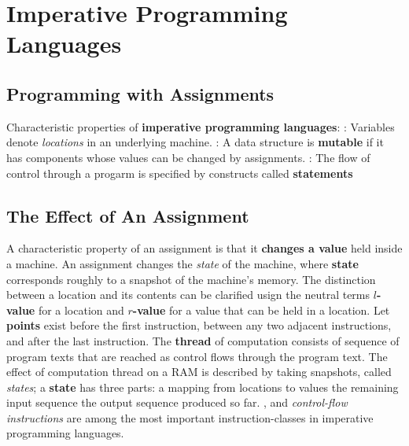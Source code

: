 \documentclass{article}
\begin{document}
\section{Imperative Programming Languages}
\subsection{Programming with Assignments}
\bit
\w Characteristic properties of {\bf{}imperative programming languages\/}:
	\ben
	: 
		Variables denote {\em{}locations\/} in an underlying machine.
	:
		A data structure is {\bf{}mutable} 
		if it has components whose values can be changed by 
		assignments.
	:
		The flow of control through a progarm is specified
		by constructs called {\bf{}statements\/}
	\een
\eit
\subsection{The Effect of An Assignment}
\bit
\w A characteristic property of an assignment is that it
	{\bf{}changes a value} held inside a machine.
\w An assignment changes the {\em{}state\/} of the machine, where
	{\bf{}state} corresponds roughly to a snapshot of the machine's
	memory.
\w The distinction between a location and its contents can be
	clarified usign the neutral terms
	{\bf{}$l$-value} for a location and {\bf{}$r$-value} for a value
	that can be held in a location.
	\bit
	\w Let {\bf{}points} exist before the first instruction,
	between any two adjacent instructions, and after the last instruction.
	\w The {\bf{}thread} of computation consists of sequence of
	program texts that are reached as control flows through the
	program text.
	\eit
\w The effect of computation thread on a RAM is described by taking
	snapshots, called {\em{}states\/}; a {\bf{}state} has
	three parts:
	\ben
	\w [(a)] a mapping from locations to values
	\w [(b)] the remaining input sequence
	\w [(c)] the output sequence produced so far.
	\een
{}, and 
	{\em{}control-flow instructions\/}
	are among the most important instruction-classes in imperative
	programming languages.
	\bit
	\eit
\eit
\end{document}
